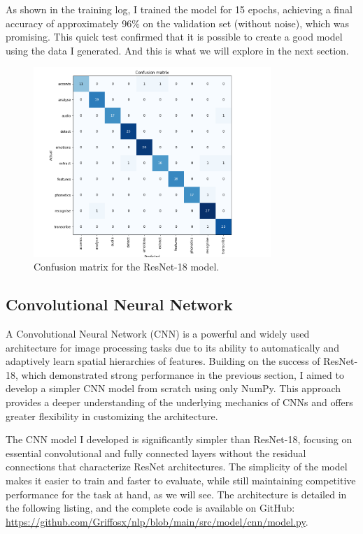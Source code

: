 \documentclass[12pt]{article}
\begin{document}
As shown in the training log, I trained the model for 15 epochs, achieving a final accuracy of approximately 96\% on the validation set (without noise), which was promising. This quick test confirmed that it is possible to create a good model using the data I generated. And this is what we will explore in the next section.

\begin{figure}[h]
\centering
\includegraphics[width=0.8\textwidth]{confusion_matrix_resnet.png}
\caption{Confusion matrix for the ResNet-18 model.}
\label{fig:confusion_matrix_resnet}
\end{figure}


\subsection{Convolutional Neural Network}

A Convolutional Neural Network (CNN) is a powerful and widely used architecture for image processing tasks due to its ability to automatically and adaptively learn spatial hierarchies of features. Building on the success of ResNet-18, which demonstrated strong performance in the previous section, I aimed to develop a simpler CNN model from scratch using only NumPy. This approach provides a deeper understanding of the underlying mechanics of CNNs and offers greater flexibility in customizing the architecture.

The CNN model I developed is significantly simpler than ResNet-18, focusing on essential convolutional and fully connected layers without the residual connections that characterize ResNet architectures. The simplicity of the model makes it easier to train and faster to evaluate, while still maintaining competitive performance for the task at hand, as we will see. The architecture is detailed in the following listing, and the complete code is available on GitHub: \href{https://github.com/Griffosx/nlp/blob/main/src/model/cnn/model.py}{https://github.com/Griffosx/nlp/blob/main/src/model/cnn/model.py}.
\end{document}

